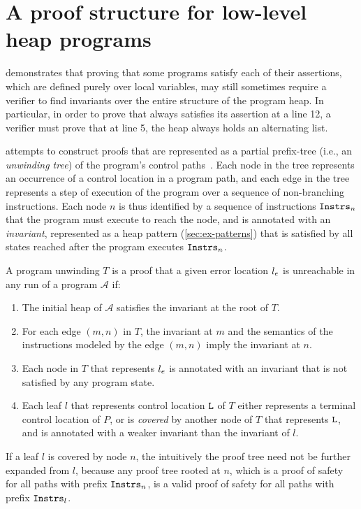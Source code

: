 \section{A proof structure for low-level heap programs}
\label{sec:ex-tree}
\altlist demonstrates that proving that some programs satisfy each of
their assertions, which are defined purely over local variables, may
still sometimes require a verifier to find invariants over the entire
structure of the program heap.
%
In particular, in order to prove that \altlist always satisfies its
assertion at a line 12, a verifier must prove that at line 5, the heap
always holds an alternating list.

\verifier attempts to construct proofs that are represented as a
partial prefix-tree (i.e., an \emph{unwinding tree}) of the program's
control paths~\cite{mcmillan06}.
Each node in the tree represents an occurrence of a control location in a
program path, and each edge in the tree represents a step of execution of
the program over a sequence of non-branching instructions.
Each node $n$ is thus identified by a sequence of instructions
$\mathtt{Instrs}_n$ that the program must execute to reach the node, and is
annotated with an \emph{invariant}, represented as a heap pattern
(\autoref{sec:ex-patterns}) that is satisfied by all states reached
after the program executes $\mathtt{Instrs}_n$.

A program unwinding $T$ is a proof that a given error location $l_e$
is unreachable in any run of a program $\mathcal{A}$ if:
%
\begin{enumerate}
%
\item
  The initial heap of $\mathcal{A}$ satisfies the invariant at the root of $T$.
\item
  For each edge $(m, n)$ in $T$, the invariant at $m$ and the
  semantics of the instructions modeled by the edge $(m, n)$ imply the
  invariant at $n$.
\item
  Each node in $T$ that represents $l_e$ is annotated with an
  invariant that is not satisfied by any program state.
\item
  Each leaf $l$ that represents control location $\mathtt{L}$ of $T$ either
  represents a terminal control location of $P$, or is \emph{covered} by
  another node of $T$ that represents $\mathtt{L}$, and is annotated with a
  weaker invariant than the invariant of $l$.
\end{enumerate}
%
If a leaf $l$ is covered by node $n$, the intuitively the proof tree
need not be further expanded from $l$, because any proof tree rooted
at $n$, which is a proof of safety for all paths with prefix
$\mathtt{Instrs}_n$, is a valid proof of safety for all paths with prefix
$\mathtt{Instrs}_l$.

